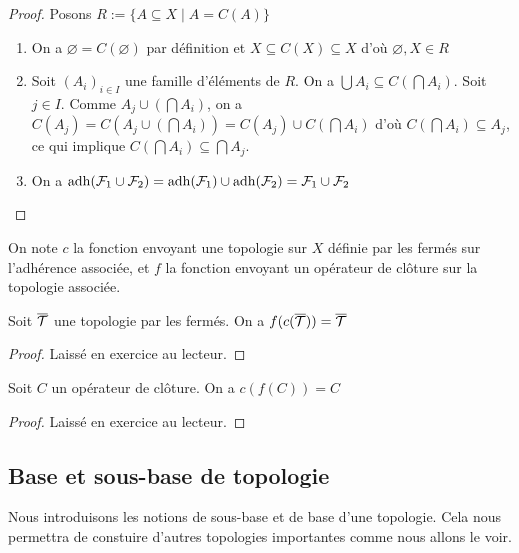 \begin{proof}Posons $R:=\{A\subseteq X\mid A = C(A)\}$
    \begin{enumerate}
        \item On a $\varnothing = C(\varnothing)$ par définition et $X\subseteq C(X)\subseteq X$ d'où $\varnothing,X\in R$
        \item Soit $(A_i)_{i\in I}$ une famille d'éléments de $R$. On a $\bigcup A_i\subseteq C(\bigcap A_i)$. Soit $j\in I$. Comme $A_j\cup(\bigcap A_i) $, on a $C(A_j) = C(A_j\cup(\bigcap A_i)) = C(A_j)\cup C(\bigcap A_i)$ d'où $C(\bigcap A_i)\subseteq A_j$, ce qui implique $C(\bigcap A_i)\subseteq \bigcap A_j$.
        \item On a $\operatorname{adh}(\mathcal{F}_1\cup\mathcal{F}_2) = \operatorname{adh}(\mathcal{F}_1)\cup\operatorname{adh}(\mathcal{F}_2) = \mathcal{F}_1\cup\mathcal{F}_2$
    \end{enumerate}
\end{proof}
\begin{notation}
    On note $c$ la fonction envoyant une topologie sur $X$ définie par les fermés sur l'adhérence associée, et $f$ la fonction envoyant un opérateur de clôture sur la topologie associée.
\end{notation}
\begin{proposition}
    Soit $\overline{\mathcal{T}}$ une topologie par les fermés. On a $f(c(\overline{\mathcal{T}})) = \overline{\mathcal{T}}$
\end{proposition}
\begin{proof}
    Laissé en exercice au lecteur.
\end{proof}
\begin{proposition}
    Soit $C$ un opérateur de clôture. On a $c(f(C)) =C $
\end{proposition}
\begin{proof}
    Laissé en exercice au lecteur.
\end{proof}
\subsection{Base et sous-base de topologie}
Nous introduisons les notions de sous-base et de base d'une topologie. Cela nous permettra de constuire d'autres topologies importantes comme nous allons le voir.

